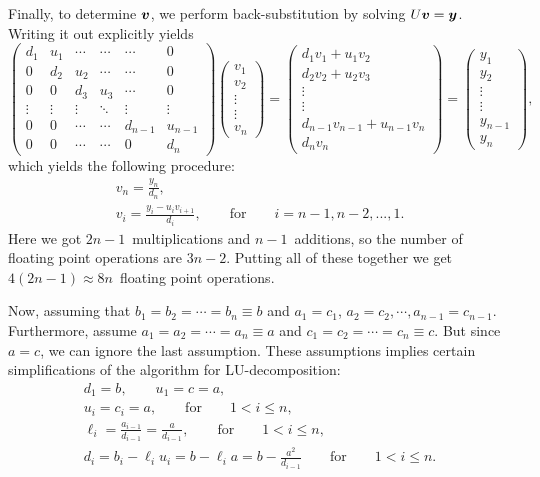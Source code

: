 \documentclass[english,notitlepage]{revtex4-1}  %
\begin{document}
Finally, to determine $\vb*{v}$, we perform back-substitution by solving $U\vb*{v} = \vb*{y}$. Writing it out explicitly yields 
\begin{equation}
	\begin{pmatrix}
	d_1 & u_1 & \cdots & \cdots &\cdots & 0 \\ 
	0 & d_2 & u_2 & \cdots & \cdots & 0 \\
	0 & 0 & d_3 & u_3 & \cdots & 0 \\
	\vdots & \vdots & \vdots & \ddots & \vdots & \vdots \\
	0 & 0 & \cdots & \cdots & d_{n-1} & u_{n-1} \\
	0 & 0 & \cdots & \cdots & 0 & d_n
	\end{pmatrix}
	\begin{pmatrix}
	v_1 \\ v_2 \\ \vdots \\ \vdots \\ v_n
	\end{pmatrix}
	= 
	\begin{pmatrix}
	d_1v_1 + u_1v_2 \\
	d_2v_2 + u_2v_3 \\ 
	\vdots \\ 
	\vdots \\
	d_{n-1}v_{n-1} + u_{n-1}v_n \\ 
	d_nv_n
	\end{pmatrix}
	=
	\begin{pmatrix}
	y_1 \\ y_2 \\ \vdots \\ \vdots \\ y_{n-1} \\ y_n 
	\end{pmatrix},
\end{equation}
which yields the following procedure: 
\begin{gather}
	v_n = \frac{y_n}{d_n}, \\
	v_i = \frac{y_i - u_iv_{i+1}}{d_i}, \qquad \text{for} \qquad i = n-1, n-2, ..., 1.
\end{gather}
Here we got $2n-1$ multiplications and $n-1$ additions, so the number of floating point operations are $3n-2$. Putting all of these together we get $4(2n-1) \approx 8n $ floating point operations.


Now, assuming that $b_1 = b_2 = \cdots = b_n \equiv b$ and $a_1 = c_1$, $a_2 = c_2,  \cdots, a_{n-1} = c_{n-1}$. Furthermore, assume $a_1 = a_2 = \cdots = a_n \equiv a$ and 
$c_1 = c_2 = \cdots = c_n \equiv c$. But since $a = c$, we can ignore the last assumption. These assumptions implies certain simplifications of the algorithm for LU-decomposition:
\begin{gather}
	d_1 = b, \qquad u_1 = c = a, \\
	u_i = c_i = a, \qquad \text{for} \qquad 1 < i \leq n,\\
	\ell_i = \frac{a_{i-1}}{d_{i-1}} = \frac{a}{d_{i-1}}, \qquad \text{for} \qquad 1 < i \leq n,\\
	d_i = b_i - \ell_iu_i = b - \ell_ia = b - \frac{a^2}{d_{i-1}} \qquad \text{for} \qquad 1 < i \leq n.
\end{gather}
\end{document}
